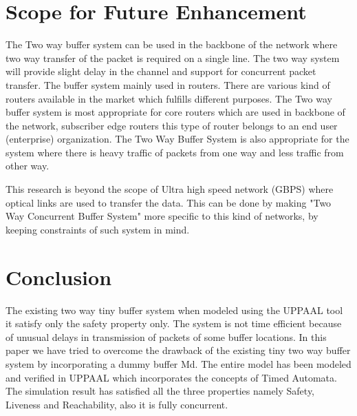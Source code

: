 \documentclass[letterpaper]{article}
\begin{document}
\section{Scope for Future Enhancement}
\label{12}
The Two way buffer system can be used in the backbone of the network where two way transfer of the packet is required on a single line. The two way system will provide slight delay in the channel and support for concurrent packet transfer. The buffer system mainly used in routers. There are various kind of routers available in the market which fulfills different purposes. The Two way buffer system is most appropriate for core routers which are used in backbone of the network, subscriber edge routers this type of router belongs to an end user (enterprise) organization. The Two Way Buffer System is also appropriate for the system where there is heavy traffic of packets from one way and less traffic from other way. 
\par This research is beyond the scope of Ultra high speed network (GBPS) where optical links are used to transfer the data. This can be done by making "Two Way Concurrent Buffer System" more specific to this kind of networks, by keeping constraints of such system in mind. 


\section{Conclusion}
\label{13}
The existing two way tiny buffer system when modeled using the UPPAAL tool it satisfy only the safety property only. The system is not time efficient because of unusual delays in transmission of packets of some buffer locations. In this paper we have tried to overcome the drawback of the existing tiny two way buffer system by incorporating a dummy buffer Md. The entire model has been modeled and verified in UPPAAL which incorporates the concepts of Timed Automata. The simulation result has satisfied all the three properties namely Safety, Liveness and Reachability, also it is fully concurrent.




\balance

\end{document}
